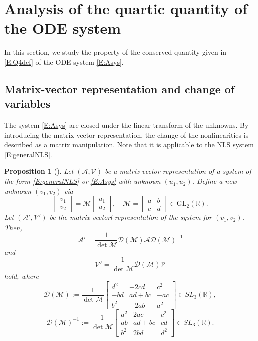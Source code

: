 \documentclass[11pt,a4paper,oneside]{amsart}
\theoremstyle{plain}
\newtheorem{proposition}[theorem]{Proposition}
\theoremstyle{remark}
\numberwithin{equation}{section}
\newcommand{\R}{\mathbb{R}}
\DeclareMathOperator{\sign}{sign}
\DeclareMathOperator{\rank}{rank}
\theoremstyle{definition}
\begin{document}
\section{Analysis of the quartic quantity of the ODE system}\label{S:pre}
In this section, we study the property of the conserved quantity given in \eqref{E:Q4def} of the ODE system \eqref{E:Asys}.

\subsection{Matrix-vector representation and change of variables}

The system \eqref{E:Asys} are closed under the linear transform of the unknowns.
By introducing the matrix-vector representation,
the change of the nonlinearities is described
as a matrix manipulation.
Note that it is applicable to the NLS system
\eqref{E:generalNLS}.
\begin{proposition}[\cite{MSU2}]\label{P:change}
Let $(\mathscr{A},\mathscr{V})$ be a matrix-vector representation of a system of the form \eqref{E:generalNLS} or \eqref{E:Asys}
with unknown $(u_1,u_2)$.
Define a new unknown $(v_1,v_2)$ via
\[
	\begin{bmatrix} v_1 \\ v_2 \end{bmatrix} = \mathscr{M} \begin{bmatrix} u_1 \\ u_2 \end{bmatrix},\quad
	\mathscr{M} = \begin{bmatrix} a & b \\ c & d \end{bmatrix} \in \text{GL}_2(\R).
\]
Let $(\mathscr{A}',\mathscr{V}')$ be the matrix-vectorl representation of the system for $(v_1,v_2)$. Then,
\begin{equation}\label{E:Aprime}
	\mathscr{A}' = \frac{1}{\det \mathscr{M}}  \mathscr{D}(\mathscr{M}) \mathscr{A} \mathscr{D}(\mathscr{M})^{-1}
\end{equation}
and
\begin{equation}\label{E:Vprime}
	\mathscr{V}'
	= \frac1{\det \mathscr{M}}  \mathscr{D}(\mathscr{M}) \mathscr{V}
\end{equation}
hold, where
\[
	\mathscr{D}(\mathscr{M}) := \frac1{\det \mathscr{M}}
	\begin{bmatrix} d^2 & -2cd & c^2 \\ -bd & ad+ bc & -ac \\ b^2 & -2ab & a^2 \end{bmatrix}
	\in {SL}_3 (\R),
\]
\begin{equation*}%
	\mathscr{D}(\mathscr{M})^{-1} :=\frac1{\det \mathscr{M}}\begin{bmatrix} a^2 & 2ac & c^2 \\ ab & ad+ bc & cd \\ b^2 & 2bd & d^2 \end{bmatrix} \in SL_3(\R).
\end{equation*}
\end{proposition}
\end{document}
